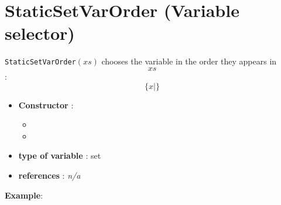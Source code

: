 \section{StaticSetVarOrder (Variable selector)}\label{staticsetvarorder:staticsetvarordervarselector}\hypertarget{staticsetvarorder:staticsetvarordervarselector}{}
\begin{notedef}
  \texttt{StaticSetVarOrder}$(xs)$ chooses the variable in the order they appears in $$xs$$:
$$\{x | \}$$
\end{notedef}

\begin{itemize}
	\item \textbf{Constructor} : 
	\begin{itemize}
	\item {}
	\item {}
	\end{itemize}	
	\item \textbf{type of variable} : set
	\item \textbf{references} : \emph{n/a}
\end{itemize}

\textbf{Example}:
%

